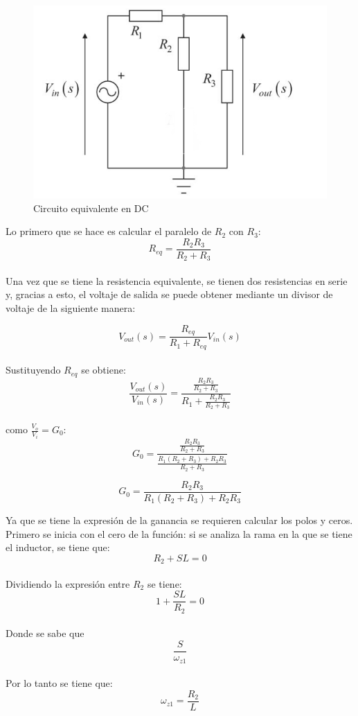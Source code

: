 \documentclass[letterpaper,12pt]{article}
\begin{document}
\begin{figure}[h]
	\centering
	\includegraphics[scale=0.5]{F_2}
	\caption{Circuito equivalente en DC}
\end{figure}

Lo primero que se hace es calcular el paralelo de $R_2$ con $R_3$:
$$R_{eq}=\frac{R_2R_3}{R_2+R_3}$$
\\
Una vez que se tiene la resistencia equivalente, se tienen dos resistencias en serie y, gracias a esto, el voltaje de salida se puede obtener mediante un divisor de voltaje de la siguiente manera:

$$V_{out}(s)= \frac{R_{eq}}{R_1+R_{eq}}V_{in}(s)$$
\\
Sustituyendo $R_{eq}$ se obtiene:
$$\frac{V_{out}(s)}{V_{in}(s)}= \frac{\frac{R_2R_3}{R_2+R_3}}{R_1+\frac{R_2R_3}{R_2+R_3}}$$
\\
como $\frac{V_o}{V_i}= G_0$:
$$G_0=\frac{\frac{R_2R_3}{R_2+R_3}}{\frac{R_1(R_2+R_3)+R_2R_3}{R_2+R_3}}$$

$$G_0=\frac{R_2R_3}{R_1(R_2+R_3)+R_2R_3}$$

Ya que se tiene la expresión de la ganancia se requieren calcular los polos y ceros. Primero se inicia con el cero de la función: si se analiza la rama en la que se tiene el inductor, se tiene que:
$$R_2+SL=0$$ \\
Dividiendo la expresión entre $R_2$ se tiene:
 $$1+\frac{SL}{R_2}=0$$ \\
 Donde se sabe que $$\frac{S}{\omega_{z1}}$$
 \\
 Por lo tanto se tiene que:
 $$\omega_{z1}=\frac{R_2}{L}$$\\\\\\
 \newpage
 
\end{document}
